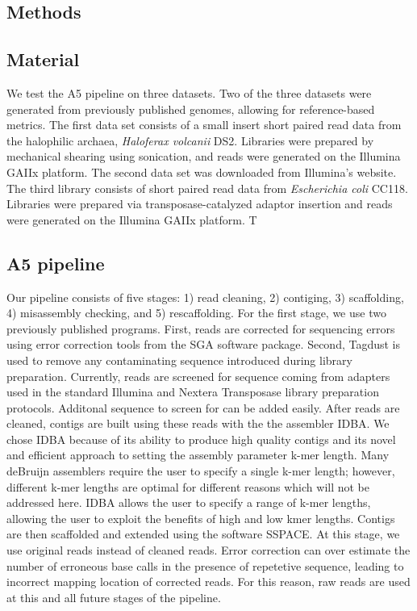 \documentclass{bioinfo}
\begin{document}
\begin{methods}
\section{Methods}
\subsection{Material}

We test the A5 pipeline on three datasets. Two of the three datasets were generated from
previously published genomes, allowing for reference-based metrics. The first data set consists of a small insert 
short paired read data from the halophilic archaea, \emph{Haloferax volcanii} DS2. Libraries
were prepared by mechanical shearing using sonication, and reads were generated on
the Illumina GAIIx platform. The second data set was downloaded from Illumina's website. 
The third library consists of short paired read data from \emph{Escherichia 
coli} CC118. Libraries were prepared via transposase-catalyzed adaptor insertion and reads 
were generated on the Illumina GAIIx platform. T

\subsection{A5 pipeline}

Our pipeline consists of five stages: 1) read cleaning, 2) contiging, 3) scaffolding,
4) misassembly checking, and 5) rescaffolding. For the first stage, we use two previously
published programs. First, reads are corrected for sequencing errors using error correction tools 
from the SGA software package. Second, Tagdust is used to remove any contaminating sequence introduced
during library preparation. Currently, reads are screened for sequence coming from adapters
used in the standard Illumina and Nextera Transposase library preparation protocols. Additonal 
sequence to screen for can be added easily. After reads are cleaned, contigs are built
using these reads with the the assembler IDBA. We chose IDBA because of its ability to produce 
high quality contigs and its novel and efficient approach to setting the assembly parameter k-mer length. 
Many deBruijn assemblers require the user to specify a single k-mer length; however, different k-mer
lengths are optimal for different reasons which will not be addressed here. IDBA allows the user to specify
a range of k-mer lengths, allowing the user to exploit the benefits of high and low kmer lengths.
Contigs are then scaffolded and extended using the software SSPACE. At this stage, we use original reads
instead of cleaned reads. Error correction can over estimate the number of erroneous base calls in 
the presence of repetetive sequence, leading to incorrect mapping location of corrected reads. 
For this reason, raw reads are used at this and all future stages of the pipeline. 


\end{methods}
\end{document}
